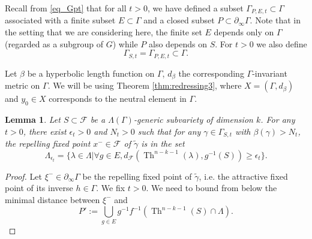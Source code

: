 \documentclass[12pt]{amsbook}%
\newtheorem{lem}[thm]{Lemma}
\theoremstyle{definition}
\theoremstyle{remark}
\numberwithin{section}{chapter}
\numberwithin{subsection}{section}
\numberwithin{figure}{chapter}
\DeclareMathOperator{\Th}{Th}
\def\cF{{\mathscr{F}}}
\def\Ga{\Gamma}
\def\ga{\gamma}
\def\La{\Lambda}
\def\geo{\partial_\infty}
\def\mini{\scriptsize}
\def\kap{}
\begin{document}
{{%


Recall from \eqref{eq_Gpt} that for all $t > 0$, we have defined a subset 
$\Gamma_{P,E,t}\subset \Ga$ associated with a finite subset $E\subset \Ga$ and a closed 
subset $P\subset \geo \Ga$. Note that in the setting that we are considering here, the finite 
set $E$ depends only on $\Gamma$ (regarded as a subgroup of $G$) 
while $P$ also depends on $S$. 
For  $t>0$ we also define 
\begin{equation} \label{eq_defi_gammaSt_flags1}
\Gamma_{S,t} = \Gamma_{P,E,t}\subset \Ga. 
\end{equation}

Let $\beta$ be a hyperbolic length function on $\Ga$, $d_\beta$ the corresponding $\Ga$-invariant metric on $\Ga$. We will be 
using Theorem \ref{thm:redressing3}, where $X=(\Ga, d_\beta)$ and $y_0\in X$ corresponds to the neutral element in $\Ga$. 





\begin{lem}\label{uniformboundedawayfromthelimitset1}
Let $S\subset \cF$ be a $\Lambda(\Gamma)$-generic subvariety of dimension $k$. For any $t >0$, there exist $\epsilon_t>0$ and $N_t>0$ such that for any $\gamma \in \Gamma_{S,t}$ with $\beta(\gamma)>N_t$, the repelling fixed point $x^-\in \cF$ of $\tilde{\gamma}$ is in the set 
\[
\Lambda_{\epsilon_t}=\{\lambda\in \Lambda\vert \forall g\in E, d_\cF\left(\Th^{n-k-1}(\lambda),g^{-1}(S)\right)\geq \epsilon_t \}.
\]
\end{lem}

\begin{proof} 
Let $\xi^-\in \geo \Ga$ be the repelling fixed point of $\tilde\ga$, i.e. the attractive fixed point of its inverse $h\in \Ga$.  
We fix $t >0$. We need to bound from below the minimal distance between $\xi^-$ and 
$$
P':=\bigcup_{g\in E} g^{-1} f^{-1}(\Th^{n-k-1}(S)\cap \Lambda). 
$$


\end{proof}}}
\end{document}
